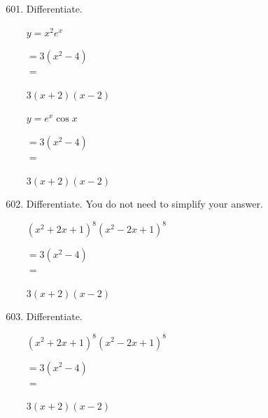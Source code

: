 \setcounter{exercise}{600}
%
%
\begin{enumerate}[resume] 
    \setcounter{enumi}{600}
    \item Differentiate.\\
    \begin{exercise}$y=x^2 e^x$ \\
        \begin{envSolution}
            $ =3(x^2-4)   $\\ 
            $ =$			 
                \begin{shortsolution}
  	                $ 3(x+2)(x-2)$
                \end{shortsolution}
        \end{envSolution}%
    \end{exercise}

    \begin{exercise}$y=e^x \cos x$ \\
        \begin{envSolution}
            $ =3(x^2-4)   $\\ 
            $ =$			 
                \begin{shortsolution}
  	                $ 3(x+2)(x-2)$
                \end{shortsolution}
        \end{envSolution}%
    \end{exercise}
 	
    \item Differentiate. You do not need to simplify your answer.\\
    \begin{exercise}$(x^2+2x+1)^8 (x^2-2x+1)^8$ \\
        \begin{envSolution}
            $ =3(x^2-4)   $\\ 
            $ =$			 
                \begin{shortsolution}
  	                $ 3(x+2)(x-2)$
                \end{shortsolution}
        \end{envSolution}%
    \end{exercise}

    \item Differentiate.\\
    \begin{exercise}$(x^2+2x+1)^8 (x^2-2x+1)^8$ \\
        \begin{envSolution}
            $ =3(x^2-4)   $\\ 
            $ =$			 
                \begin{shortsolution}
  	                $ 3(x+2)(x-2)$
                \end{shortsolution}
        \end{envSolution}%
    \end{exercise}	
	
\end{enumerate}


